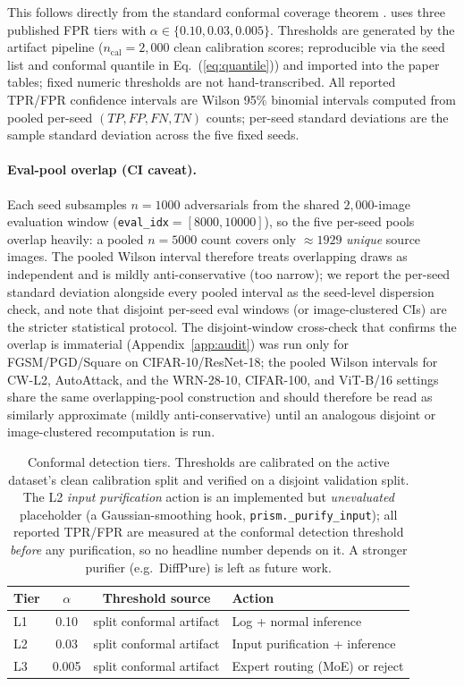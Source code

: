 \noindent
This follows directly from the standard conformal coverage theorem 
\cite{vovk2005algorithmic}.
\prism uses three published FPR tiers with $\alpha \in \{0.10, 0.03, 0.005\}$.
Thresholds are generated by the artifact pipeline ($n_\text{cal}=2{,}000$
clean calibration scores; reproducible via the seed list and conformal
quantile in Eq.~(\ref{eq:quantile})) and imported into the paper tables;
fixed numeric thresholds are not hand-transcribed. All reported TPR/FPR
confidence intervals are Wilson 95\% binomial intervals computed from
pooled per-seed $(TP,FP,FN,TN)$ counts; per-seed standard deviations are
the sample standard deviation across the five fixed seeds.
\paragraph{Eval-pool overlap (CI caveat).} Each seed subsamples
$n{=}1000$ adversarials from the shared $2{,}000$-image evaluation
window (\texttt{eval\_idx}$=[8000,10000]$), so the five per-seed pools
overlap heavily: a pooled $n{=}5000$ count covers only $\approx 1929$
\emph{unique} source images. The pooled Wilson interval therefore treats
overlapping draws as independent and is mildly anti-conservative (too
narrow); we report the per-seed standard deviation alongside every
pooled interval as the seed-level dispersion check, and note that disjoint
per-seed eval windows (or image-clustered CIs) are the stricter statistical
protocol. The disjoint-window cross-check that confirms the
overlap is immaterial (Appendix~\ref{app:audit}) was run only for
FGSM/PGD/Square on CIFAR-10/ResNet-18; the pooled Wilson intervals for
CW-L2, AutoAttack, and the WRN-28-10, CIFAR-100, and ViT-B/16 settings
share the same overlapping-pool construction and should therefore be
read as similarly approximate (mildly anti-conservative) until an
analogous disjoint or image-clustered recomputation is run.

\begin{table}[h]
\centering
\small
\begin{tabular}{lccl}
\toprule
Tier & $\alpha$ & Threshold source & Action \\
\midrule
L1 & 0.10 & split conformal artifact & Log + normal inference \\
L2 & 0.03 & split conformal artifact & Input purification + inference \\
L3 & 0.005 & split conformal artifact & Expert routing (MoE) or reject \\
\bottomrule
\end{tabular}
\caption{Conformal detection tiers. Thresholds are calibrated on the active
dataset's clean calibration split and verified on a disjoint validation split.
The L2 \emph{input purification} action is an implemented but
\emph{unevaluated} placeholder (a Gaussian-smoothing hook,
\texttt{prism.\_purify\_input}); all reported TPR/FPR are measured at the
conformal detection threshold \emph{before} any purification, so no headline
number depends on it. A stronger purifier (e.g.\ DiffPure) is left as future
work.}
\label{tab:tiers}
\end{table}

